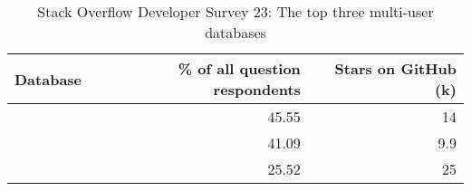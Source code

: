 \begin{table}[ht]
\centering
\caption{Stack Overflow Developer Survey 23: The top three multi-user databases \parencite{stackOverflowPollDatabases23}}
\label{tab:stackOverflowDatabasesRanking}
\begin{tabular}[t]{|l|r|r|}
\toprule
Database & \% of all question respondents & Stars on GitHub (k)\\
\midrule
\cite{githubPostgreSql} & 45.55 & 14\\
\cite{githubMySql} & 41.09 & 9.9\\
\cite{githubMongoDb} & 25.52 & 25\\
\bottomrule
\end{tabular}
\end{table}

